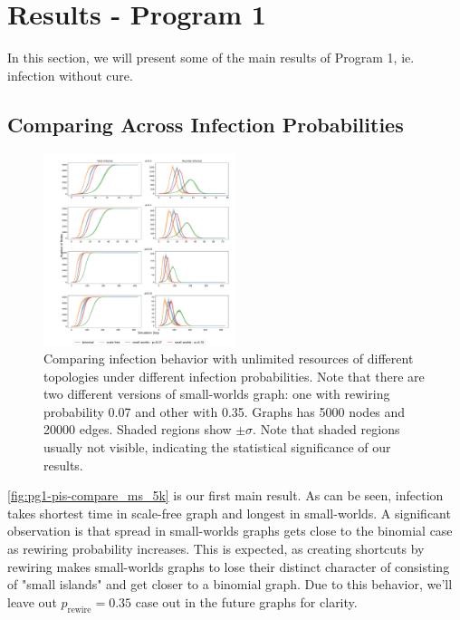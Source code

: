 \documentclass[conference]{IEEEtran}
\begin{document}
\section{Results - Program 1}

In this section, we will present some of the main results of Program 1, ie. infection without cure.

\subsection{Comparing Across Infection Probabilities}\label{sec:pg1-compare-pis}

\begin{figure}[htb]
  \begin{center}
	\includegraphics[width=0.5\textwidth]{img/pg1-pis-compare_ms_5k.pdf}
  \end{center}
	\caption{Comparing infection behavior with unlimited resources of different topologies under different infection probabilities. Note that there are two different versions of small-worlds graph: one with rewiring probability 0.07 and other with 0.35. Graphs has 5000 nodes and 20000 edges. Shaded regions show $\pm \sigma$. Note that shaded regions usually not visible, indicating the statistical significance of our results.}
	\label{fig:pg1-pis-compare_ms_5k}
\end{figure}

\autoref{fig:pg1-pis-compare_ms_5k} is our first main result. As can be seen, infection takes shortest time in scale-free graph and longest in small-worlds. A significant observation is that spread in small-worlds graphs gets close to the binomial case as rewiring probability increases. This is expected, as creating shortcuts by rewiring makes small-worlds graphs to lose their distinct character of consisting of "small islands" and get closer to a binomial graph. Due to this behavior, we'll leave out $p_{\text{rewire}}=0.35$ case out in the future graphs for clarity.
\end{document}

